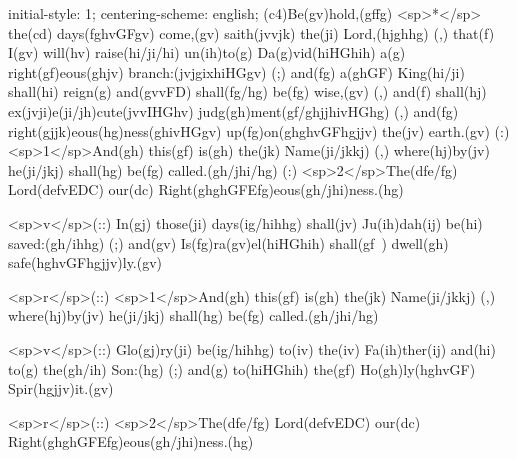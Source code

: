 initial-style: 1;
centering-scheme: english;
(c4)Be(gv)hold,(gffg) <sp>*</sp> the(cd) days(fghvGFgv) come,(gv) saith(jvvjk) the(ji) Lord,(hjghhg) (,) that(f) I(gv) will(hv) raise(hi/ji/hi) un(ih)to(g) Da(g)vid(hiHGhih) a(g) right(gf)eous(ghjv) branch:(jvjgixhiHGgv) (;) and(fg) a(ghGF) King(hi/ji) shall(hi) reign(g) and(gvvFD) shall(fg/hg) be(fg) wise,(gv) (,) and(f) shall(hj) ex(jvji)e(ji/jh)cute(jvvIHGhv) judg(gh)ment(gf/ghjjhivHGhg) (,) and(fg) right(gjjk)eous(hg)ness(ghivHGgv) up(fg)on(ghghvGFhgjjv) the(jv) earth.(gv) (:) <sp>1</sp>And(gh) this(gf) is(gh) the(jk) Name(ji/jkkj) (,) where(hj)by(jv) he(ji/jkj) shall(hg) be(fg) called.(gh/jhi/hg) (:) <sp>2</sp>The(dfe/fg) Lord(defvEDC) our(dc) Right(ghghGFEfg)eous(gh/jhi)ness.(hg) 

<sp>v</sp>(::) In(gj) those(ji) days(ig/hihhg) shall(jv) Ju(ih)dah(ij) be(hi) saved:(gh/ihhg) (;) and(gv) Is(fg)ra(gv)el(hiHGhih) shall(gf~) dwell(gh) safe(hghvGFhgjjv)ly.(gv) 

<sp>r</sp>(::) <sp>1</sp>And(gh) this(gf) is(gh) the(jk) Name(ji/jkkj) (,) where(hj)by(jv) he(ji/jkj) shall(hg) be(fg) called.(gh/jhi/hg)

<sp>v</sp>(::) Glo(gj)ry(ji) be(ig/hihhg) to(iv) the(iv) Fa(ih)ther(ij) and(hi) to(g) the(gh/ih) Son:(hg) (;) and(g) to(hiHGhih) the(gf) Ho(gh)ly(hghvGF) Spir(hgjjv)it.(gv)

<sp>r</sp>(::) <sp>2</sp>The(dfe/fg) Lord(defvEDC) our(dc) Right(ghghGFEfg)eous(gh/jhi)ness.(hg) 